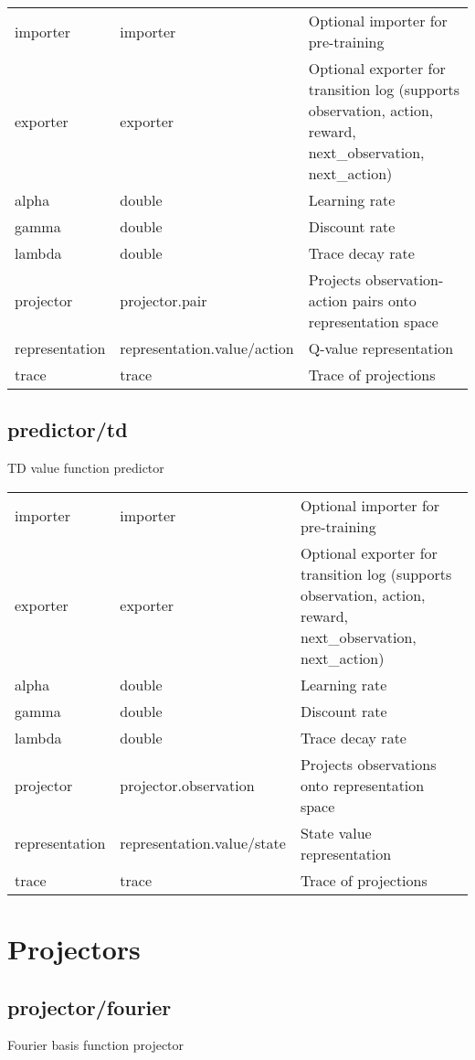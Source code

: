 \noindent\begin{tabular}{@{}lll@{}}
importer&importer&Optional importer for pre-training\\
exporter&exporter&Optional exporter for transition log (supports observation, action, reward, next\_observation, next\_action)\\
alpha&double&Learning rate\\
gamma&double&Discount rate\\
lambda&double&Trace decay rate\\
projector&projector.pair&Projects observation-action pairs onto representation space\\
representation&representation.value/action&Q-value representation\\
trace&trace&Trace of projections\\
\end{tabular}
\subsection{predictor/td}
\noindent TD value function predictor\\

\noindent\begin{tabular}{@{}lll@{}}
importer&importer&Optional importer for pre-training\\
exporter&exporter&Optional exporter for transition log (supports observation, action, reward, next\_observation, next\_action)\\
alpha&double&Learning rate\\
gamma&double&Discount rate\\
lambda&double&Trace decay rate\\
projector&projector.observation&Projects observations onto representation space\\
representation&representation.value/state&State value representation\\
trace&trace&Trace of projections\\
\end{tabular}
\section{Projectors}
\subsection{projector/fourier}
\noindent Fourier basis function projector\\

